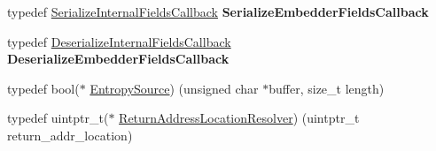 \begin{DoxyCompactItemize}
typedef \mbox{\hyperlink{structv8_1_1SerializeInternalFieldsCallback}{Serialize\+Internal\+Fields\+Callback}} {\bfseries Serialize\+Embedder\+Fields\+Callback}
\item 
\mbox{\label{namespacev8_a7772c1eef013272480733d9d1b068fb2}} 
typedef \mbox{\hyperlink{structv8_1_1DeserializeInternalFieldsCallback}{Deserialize\+Internal\+Fields\+Callback}} {\bfseries Deserialize\+Embedder\+Fields\+Callback}
\item 
typedef bool($\ast$ \mbox{\hyperlink{namespacev8_ab699f4bbbb56350e6e915682e420fcdc}{Entropy\+Source}}) (unsigned char $\ast$buffer, size\+\_\+t length)
\item 
typedef uintptr\+\_\+t($\ast$ \mbox{\hyperlink{namespacev8_a8ce54c75241be41ff6a25e9944eefd2a}{Return\+Address\+Location\+Resolver}}) (uintptr\+\_\+t return\+\_\+addr\+\_\+location)
\end{DoxyCompactItemize}
